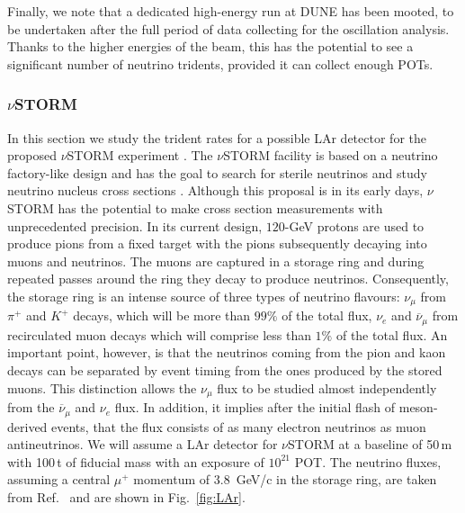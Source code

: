 Finally, we note that a dedicated high-energy run at DUNE has been mooted, to be undertaken after the full period of data collecting for the oscillation analysis. Thanks to the higher energies of the beam, this has the potential to see a significant number of neutrino tridents, provided it can collect enough POTs.  

\subsubsection{$\nu$STORM}
\label{subsubsec:nuSTORM}
In this section we study the trident rates for a possible LAr detector for the proposed 
$\nu$STORM experiment \cite{Soler:2015ada,nuSTORM2017}. The $\nu$STORM facility 
is based on a neutrino factory-like design and has the goal to search for sterile neutrinos and study neutrino nucleus cross sections \cite{Adey:2014rfv}. Although this proposal is in its early days, $\nu$STORM has the potential to make cross section measurements with unprecedented precision. In its current design, $120$-GeV protons are used to produce pions from a fixed target with the pions subsequently decaying into muons and neutrinos. The muons are captured in a storage ring and during repeated passes around the ring they decay to produce neutrinos.
%
Consequently, the storage ring is an intense source of three types of neutrino
flavours: $\nu_\mu$ from $\pi^+$ and $K^+$ decays, which will be more than $99\%$ of the total flux, $\nu_e$ and $\overline\nu_\mu$ from recirculated muon decays which will comprise less than $1\%$ of the total flux. An important point, however, is that the neutrinos coming from the pion and kaon decays can be separated by event timing from the ones produced by the stored muons. This distinction allows the $\nu_\mu$ flux to be studied almost independently from the $\overline{\nu}_\mu$ and $\nu_e$ flux. In addition, it implies after the initial flash of meson-derived events, that the flux consists of as many electron neutrinos as muon antineutrinos. We will assume a LAr detector for $\nu$STORM at a baseline of 50\,m with 100\,t of fiducial mass with an exposure of $10^{21}$ POT. The neutrino fluxes, assuming 
a central $\mu^+$ momentum of $3.8$~GeV/c in the storage ring, are taken from Ref.~\cite{nuSTORM2017} and are 
shown in Fig.~\ref{fig:LAr}.

